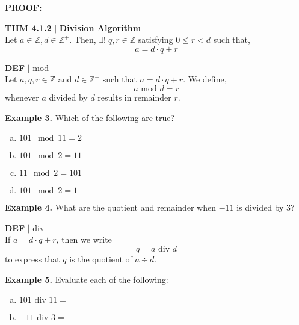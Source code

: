 \documentclass [12pt]{article}
\begin{document}
\raggedright
\textbf{PROOF:}
\vspace{3in}
\begin{framed}
\textbf{THM 4.1.2} $|$ \textbf{Division Algorithm }\\
\vspace{0.5cm}
Let $a\in \mathbb{Z}, d \in \mathbb{Z}^{+}$. Then, $\exists! \; q, r \in \mathbb{Z}$ satisfying $0 \leq r <
d$ such that, \\
\[ a = d\cdot q +r\]
\end{framed}
\pagebreak
\begin{framed}
\textbf{DEF} $|$ mod \\
Let $a, q, r \in \mathbb{Z}$ and $d \in \mathbb{Z}^{+}$ such that $a = d\cdot q + r$. We define, \\
\[a \text{ mod } d = r\]
whenever $a$ divided by $d$ results in remainder $r$.
\end{framed}
\vspace{0.5cm}
\raggedright
\textbf{Example 3.} Which of the following are true?
\begin{enumerate}[(a)]
\item $101 \mod 11 = 2$ \vspace{0.25cm}
\item $101 \mod 2 = 11$ \vspace{0.25cm}
\item $11 \mod 2 = 101$ \vspace{0.25cm}
\item $101 \mod 2 = 1$
\end{enumerate}
\vspace{1cm}
\raggedright
\textbf{Example 4.} What are the quotient and remainder when $-11$ is divided by 3?
\vspace{1in}
\begin{framed}
\textbf{DEF} $|$ div \\
\vspace{0.25cm}
If $a = d \cdot q + r $, then we write \[q = a \text{ div } d\] to express that $q$ is the quotient of $a \div
d$. \\
\end{framed}
\vspace{0.25cm}
\raggedright
\textbf{Example 5.} Evaluate each of the following:
\begin{enumerate}[(a)]
\item $101 \text{ div } 11 = $ \vspace{0.5cm}
\item $-11 \text{ div } 3 = $ \vspace{0.5cm}
\end{enumerate}
\pagebreak
\end{document}
